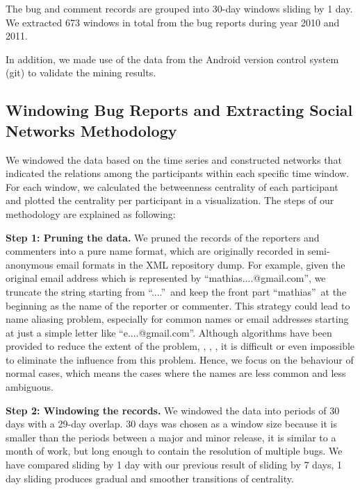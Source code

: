 \documentclass[conference]{IEEEtran}
\begin{document}
The bug and comment records are grouped into 30-day windows sliding by
1 day. 
We extracted 673 windows in total from the bug reports during year 2010 and 2011.

In addition, we made use of the data from the Android version control
system (git)
to validate the mining results.



\subsection{Windowing Bug Reports and Extracting Social Networks Methodology}
We windowed the data based on the time series and constructed networks
that indicated the relations among the participants within each specific
time window. For each window, we calculated the betweenness centrality of each
participant and plotted the centrality per participant in a visualization. The steps of our methodology are
explained as following:


\textbf{Step 1: Pruning the data.} We pruned the records of the
reporters and commenters into a pure name format, which are originally
recorded in semi-anonymous email formats in the XML repository dump. 
For example, given the original email address which is represented by
\textquotedblleft mathias....@gmail.com\textquotedblright, we truncate
the string starting from \textquotedblleft ....\textquotedblright \
and keep the front part \textquotedblleft mathias\textquotedblright \
at the beginning as the name of the reporter or commenter. 
This strategy could lead to name aliasing problem, especially for
common names or email addresses starting at just a simple letter like
\textquotedblleft e....@gmail.com\textquotedblright.
 Although algorithms have been provided to reduce the extent of the problem, \cite{ACM:robles}, \cite{ACM:bird}, \cite{Elsevier:goeminne}, it is difficult or even impossible to eliminate the influence from
 this problem. Hence, we focus on the behaviour of normal cases, which
 means the cases where the names are less common and less ambiguous.


\textbf{Step 2: Windowing the records.} We windowed the data into
periods of 30 days with a 29-day overlap. 
30 days was chosen as a window size because it is smaller than the
periods between a major and minor release, it is similar to a month of
work, but long enough to contain the resolution of multiple bugs.
We have compared sliding by 1 day with our previous result of sliding by 7
days, 1 day sliding produces gradual and smoother transitions of
centrality.
\end{document}
